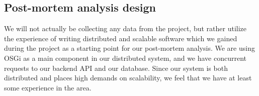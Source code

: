 \documentclass{article}
\begin{document}
\subsection{Post-mortem analysis design}
 
We will not actually be collecting any data from the project, but rather
utilize the experience of writing distributed and scalable software which we
gained during the project as a starting point for our post-mortem analysis. We
are using OSGi \cite{marples2001open} as a main component in our distributed
system, and we have concurrent requests to our backend API and our database.
Since our system is both distributed and places high demands on scalability, we
feel that we have at least some experience in the area.




 
\end{document}
